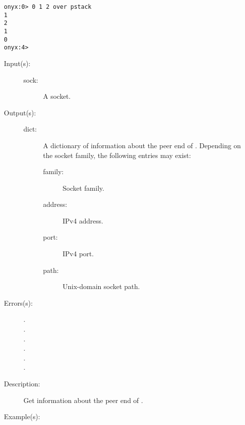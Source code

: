 \begin{description}
\begin{description}
\begin{verbatim}
onyx:0> 0 1 2 over pstack
1
2
1
0
onyx:4>
		\end{verbatim}
	\end{description}
\label{systemdict:peername}
\item[{\onyxop{sock}{peername}{dict}}: ]
	\begin{description}\item[]
	\item[Input(s): ]
		\begin{description}\item[]
		\item[sock: ]
			A socket.
		\end{description}
	\item[Output(s): ]
		\begin{description}\item[]
		\item[dict: ]
			A dictionary of information about the peer end of
			.  Depending on the socket family, the
			following entries may exist:
			\begin{description}%
			\item[family: ] Socket family.
			\item[address: ] IPv4 address.
			\item[port: ] IPv4 port.
			\item[path: ] Unix-domain socket path.
			\end{description}
		\end{description}
	\item[Errors(s): ]
		\begin{description}\item[]
		\item[.]
		\item[.]
		\item[.]
		\item[.]
		\item[.]
		\item[.]
		\end{description}
	\item[Description: ]
		Get information about the peer end of .
	\item[Example(s): ]\begin{verbatim}


\end{verbatim}
\end{description}
\end{description}
